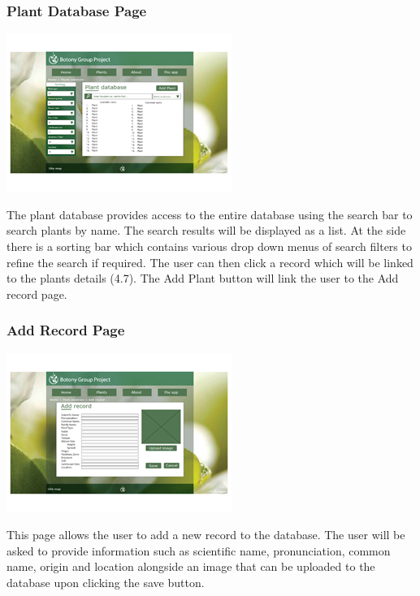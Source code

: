 \documentclass[11pt, titlepage]{article}
\begin{document}
		\subsubsection{Plant Database Page}
			\begin{center}
				\includegraphics[scale=1]{res/botanyWebPlantDatabase.png}
			\end{center}
			The plant database provides access to the entire database using the search bar to search plants by name. The search results will be displayed as a list. 
At the side there is a sorting bar which contains various drop down menus of search filters to refine the search if required. The user can then click a record which will be linked to the plants details (4.7).
The Add Plant button will link the user to the Add record page.

		\subsubsection{Add Record Page}
			\begin{center}
				\includegraphics[scale=1]{res/botanyWebAddRecord.png}
			\end{center}
			This page allows the user to add a new record to the database. The user will be asked to provide information such as scientific name, pronunciation, common name, origin and location alongside an image that can be uploaded to the database upon clicking the save button. 
\end{document}
